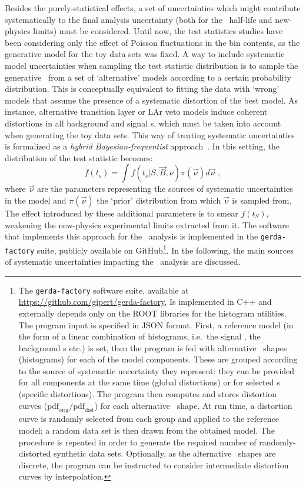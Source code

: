 Besides the purely-statistical effects, a set of uncertainties which might contribute
systematically to the final analysis uncertainty (both for the \nnbb\ half-life and
new-physics limits) must be considered. Until now, the test statistics studies have been
considering only the effect of Poisson fluctuations in the bin contents, as the generative
model for the toy data sets was fixed. A way to include systematic model uncertainties
when sampling the test statistic distribution is to sample the generative \pdf\ from a set
of `alternative' models according to a certain probability distribution. This is
conceptually equivalent to fitting the data with `wrong' models that assume the presence
of a systematic distortion of the best model. As instance, alternative transition layer
or LAr veto models induce coherent distortions in all background and signal \pdf{}s, which
must be taken into account when generating the toy data sets.
\newpar
This way of treating systematic uncertainties is formalized as a \emph{hybrid
Bayesian-frequentist} approach~\cite{Zyla2020}. In this setting, the distribution
of the test statistic becomes:
\[
  f(t_s) = \int f(t_s | S, \vec{B}, \nu) \pi(\vec{\nu}) d\vec{\nu} \;,
\]
where $\vec{\nu}$ are the parameters representing the sources of systematic uncertainties
in the model and $\pi(\vec{\nu})$ the `prior' distribution from which $\vec{\nu}$ is
sampled from. The effect introduced by these additional parameters is to smear $f(t_S)$,
weakening the new-physics experimental limits extracted from it. The software that
implements this approach for the \nnbb\ analysis is implemented in the
\texttt{gerda-factory} suite, publicly available on GitHub\footnote{%
  The \texttt{gerda-factory} software suite, available at
  \url{https://github.com/gipert/gerda-factory}, Is implemented in C++ and externally
  depends only on the ROOT libraries for the histogram utilities. The program input is
  specified in JSON format. First, a reference model (in the form of a linear combination
  of histograms, i.e.~the signal \pdf, the background \pdf{}s etc.) is set, then the program
  is fed with alternative \pdf\ shapes (histograms) for each of the model components. These
  are grouped according to the source of systematic uncertainty they represent: they can
  be provided for all components at the same time (global distortions) or for selected
  \pdf{}s (specific distortions). The program then computes and stores distortion curves
  ($\text{pdf}_\text{orig}/\text{pdf}_\text{dist}$) for each alternative \pdf\ shape. At run
  time, a distortion curve is randomly selected from each group and applied to the
  reference model; a random data set is then drawn from the obtained model. The procedure
  is repeated in order to generate the required number of randomly-distorted synthetic
  data sets. Optionally, as the alternative \pdf\ shapes are discrete, the program can be
  instructed to consider intermediate distortion curves by interpolation.
}. In the following, the main sources of systematic uncertainties impacting the \nnbb\
analysis are discussed.

